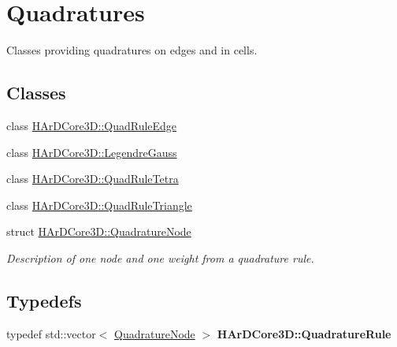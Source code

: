 \hypertarget{group__Quadratures}{}\section{Quadratures}
\label{group__Quadratures}


Classes providing quadratures on edges and in cells.  


\subsection*{Classes}
\begin{DoxyCompactItemize}
\item 
class \hyperlink{classHArDCore3D_1_1QuadRuleEdge}{H\+Ar\+D\+Core3\+D\+::\+Quad\+Rule\+Edge}
\item 
class \hyperlink{classHArDCore3D_1_1LegendreGauss}{H\+Ar\+D\+Core3\+D\+::\+Legendre\+Gauss}
\item 
class \hyperlink{classHArDCore3D_1_1QuadRuleTetra}{H\+Ar\+D\+Core3\+D\+::\+Quad\+Rule\+Tetra}
\item 
class \hyperlink{classHArDCore3D_1_1QuadRuleTriangle}{H\+Ar\+D\+Core3\+D\+::\+Quad\+Rule\+Triangle}
\item 
struct \hyperlink{structHArDCore3D_1_1QuadratureNode}{H\+Ar\+D\+Core3\+D\+::\+Quadrature\+Node}
\begin{DoxyCompactList}\small\item\em Description of one node and one weight from a quadrature rule. \end{DoxyCompactList}\end{DoxyCompactItemize}
\subsection*{Typedefs}
\begin{DoxyCompactItemize}
\item 
\mbox{\label{group__Quadratures_ga41055a24d71d12c64b5fddddc0bbad22}} 
typedef std\+::vector$<$ \hyperlink{structHArDCore3D_1_1QuadratureNode}{Quadrature\+Node} $>$ {\bfseries H\+Ar\+D\+Core3\+D\+::\+Quadrature\+Rule}
\end{DoxyCompactItemize}
